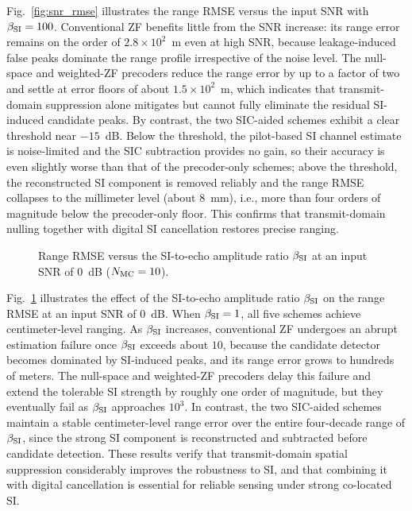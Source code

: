 Fig.~\ref{fig:snr_rmse} illustrates the range RMSE versus the input SNR with
$\beta_{\rm SI}=100$. Conventional ZF benefits little from the SNR increase:
its range error remains on the order of $2.8\times10^{2}$~m even at high SNR,
because leakage-induced false peaks dominate the range profile irrespective
of the noise level. The null-space and weighted-ZF precoders reduce the range
error by up to a factor of two and settle at error floors of about
$1.5\times10^{2}$~m, which indicates that transmit-domain suppression alone
mitigates but cannot fully eliminate the residual SI-induced candidate peaks.
By contrast, the two SIC-aided schemes exhibit a clear threshold near
$-15$~dB. Below the threshold, the pilot-based SI channel estimate is
noise-limited and the SIC subtraction provides no gain, so their accuracy is
even slightly worse than that of the precoder-only schemes; above the
threshold, the reconstructed SI component is removed reliably and the range
RMSE collapses to the millimeter level (about $8$~mm), i.e., more than four
orders of magnitude below the precoder-only floor. This confirms that
transmit-domain nulling together with digital SI cancellation restores
precise ranging.

\begin{figure}[t]
    \centering
    \fbox{\rule{0.92\linewidth}{0.36\linewidth}}
    \caption{Range RMSE versus the SI-to-echo amplitude ratio
    $\beta_{\rm SI}$ at an input SNR of $0$~dB ($N_{\rm MC}=10$).}
    \label{fig:si_strength}
\end{figure}

Fig.~\ref{fig:si_strength} illustrates the effect of the SI-to-echo amplitude
ratio $\beta_{\rm SI}$ on the range RMSE at an input SNR of $0$~dB. When
$\beta_{\rm SI}=1$, all five schemes achieve centimeter-level ranging. As
$\beta_{\rm SI}$ increases, conventional ZF undergoes an abrupt estimation
failure once $\beta_{\rm SI}$ exceeds about $10$, because the candidate
detector becomes dominated by SI-induced peaks, and its range error grows to
hundreds of meters. The null-space and weighted-ZF precoders delay this
failure and extend the tolerable SI strength by roughly one order of
magnitude, but they eventually fail as $\beta_{\rm SI}$ approaches
$10^{3}$. In contrast, the two SIC-aided schemes maintain a stable
centimeter-level range error over the entire four-decade range of
$\beta_{\rm SI}$, since the strong SI component is reconstructed and
subtracted before candidate detection. These results verify that
transmit-domain spatial suppression considerably improves the robustness to
SI, and that combining it with digital cancellation is essential for reliable
sensing under strong co-located SI.

